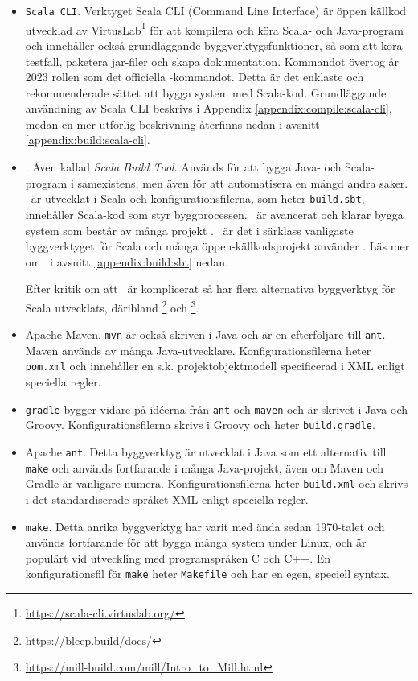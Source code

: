 \begin{itemize}

\item \texttt{Scala CLI}. Verktyget Scala CLI (Command Line Interface) är öppen källkod utvecklad av VirtusLab\footnote{\url{https://scala-cli.virtuslab.org/}} för att kompilera och köra Scala- och Java-program och innehåller också grundläggande byggverktygsfunktioner, så som att köra testfall, paketera jar-filer och skapa dokumentation. Kommandot  övertog år 2023 rollen som det officiella -kommandot. Detta är det enklaste och rekommenderade sättet att bygga system med Scala-kod. Grundläggande användning av Scala CLI beskrivs i Appendix \ref{appendix:compile:scala-cli}, medan en mer utförlig beskrivning återfinns nedan i avsnitt \ref{appendix:build:scala-cli}.

\item \sbt. Även kallad \textit{Scala Build Tool}. Används för att bygga Java- och Scala-program i samexistens, men även för att automatisera en mängd andra saker. \sbt~är utvecklat i Scala och konfigurationsfilerna, som heter \texttt{build.sbt}, innehåller Scala-kod som styr byggprocessen. \sbt~är avancerat och klarar bygga system som består av många projekt . \sbt~är det i särklass vanligaste byggverktyget för Scala och många öppen-källkodsprojekt använder \sbt. Läs mer om \sbt~i avsnitt \ref{appendix:build:sbt} nedan.

Efter kritik om att \sbt~är komplicerat så har flera alternativa byggverktyg för Scala utvecklats, däribland \footnote{\url{https://bleep.build/docs/}} och \footnote{\url{https://mill-build.com/mill/Intro_to_Mill.html}}. 


\item Apache Maven, \texttt{mvn} är också skriven i Java och är en efterföljare till \texttt{ant}. Maven används av många Java-utvecklare. Konfigurationsfilerna heter \texttt{pom.xml} och innehåller en s.k. projektobjektmodell specificerad i XML enligt  speciella regler.

\item \texttt{gradle} bygger vidare på idéerna från \texttt{ant} och \texttt{maven} och är skrivet i Java och Groovy.  Konfigurationsfilerna skrivs i Groovy och heter \texttt{build.gradle}.

\item Apache \texttt{ant}. Detta byggverktyg är utvecklat i Java som ett alternativ till \texttt{make} och används fortfarande i många Java-projekt, även om Maven och Gradle är vanligare numera. Konfigurationsfilerna heter \texttt{build.xml} och skrivs i det standardiserade språket XML enligt  speciella regler.

\item \texttt{make}. Detta anrika byggverktyg har varit med ända sedan 1970-talet och används fortfarande för att bygga många system under Linux, och är populärt vid utveckling med programspråken C och C++. En konfigurationsfil för \texttt{make} heter \texttt{Makefile} och har en egen, speciell syntax.
\end{itemize}


